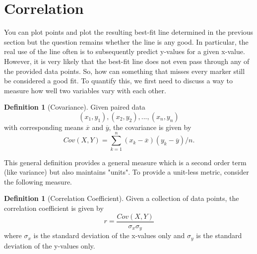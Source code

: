 \documentclass[10pt,]{book}
\theoremstyle{plain}
\theoremstyle{definition}
\newtheorem{definition}[theorem]{Definition}
\theoremstyle{definition}
\theoremstyle{definition}
\numberwithin{equation}{section}
\begin{document}
\section[{Correlation}]{Correlation}\label{section-12}

You can plot points and plot the resulting best-fit line determined in the previous section but the question remains whether the line is any good. In particular, the real use of the line often is to subsequently predict y-values for a given x-value. However, it is very likely that the best-fit line does not even pass through any of the provided data points.  So, how can something that misses every marker still be considered a good fit. To quantify this, we first need to discuss a way to measure how well two variables vary with each other.
%
\begin{definition}[{Covariance}]\label{definition-14}
Given paired data 
\begin{equation*}(x_1,y_1), (x_2,y_2), ... , (x_n,y_n)\end{equation*}
with corresponding means \(\overline{x}\) and \(\overline{y}\), the covariance is given by
\begin{equation*}Cov(X,Y) = \sum_{k=1}^n (x_k-\overline{x})(y_k-\overline{y})/n.\end{equation*}
%
\end{definition}
\par
This general definition provides a general measure which is a second order term (like variance) but also maintains "units". To provide a unit-less metric, consider the following measure.
\begin{definition}[{Correlation Coefficient}]\label{definition-15}
Given a collection of data points, the correlation coefficient is given by
\begin{equation*}r = \frac{Cov(X,Y)}{\sigma_x \sigma_y}\end{equation*}
where \(\sigma_x\) is the standard deviation of the x-values only and \(\sigma_y\) is the standard deviation of the y-values only.
%
\end{definition}
\end{document}
